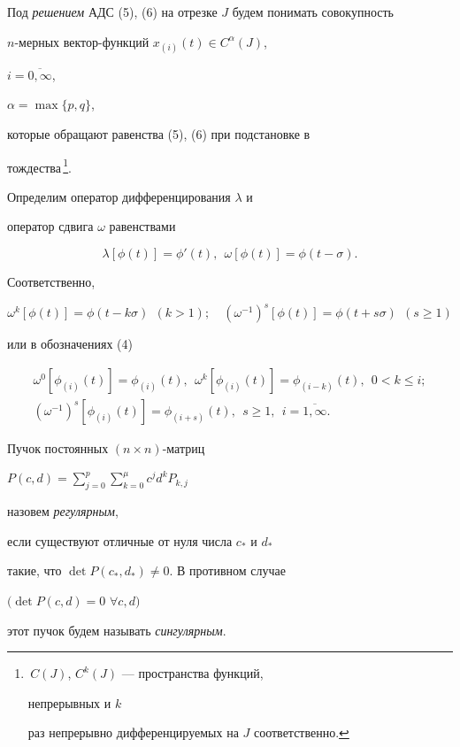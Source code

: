 \begin{defn}


Под {\it решением} АДС (5), (6) на отрезке $J$ будем понимать совокупность


$n$-мерных вектор-функций $x_{(i)}(t) \in C^{\alpha} (J)$,


$i=\overline{0, \infty}$,


$\alpha = \max \lbrace p,q \rbrace$,


которые обращают равенства (5), (6) при подстановке в


тождества\,\footnote{\,$C(J)$, $C^k (J)$ --- пространства функций, 


непрерывных и $k$


раз непрерывно дифференцируемых на $J$ соответственно.}.


\end{defn}





Определим оператор дифференцирования $\lambda$ и


оператор сдвига $\omega$ равенствами


$$


\lambda [\phi (t)]=\phi '(t),\ \ \omega [\phi(t)]=\phi (t-\sigma).


$$


Соответственно, 


$$


\omega^k[\phi(t)]=\phi(t-k\sigma ) \ \ (k>1); \quad


({\omega^{-1}})^s[\phi(t)]=\phi(t+s\sigma) \ \ (s\ge 1)


$$


или в обозначениях (4)


\begin{gather*}


\omega^0[\phi_{(i)}(t)]=\phi_{(i)}(t),\ \


\omega^k[\phi_{(i)}(t)]=\phi_{(i-k)}(t), \ \ 0< k \le i;\\


%


({\omega^{-1}})^s[\phi_{(i)}(t)]=\phi_{(i+s)}(t), \ \


s \ge 1,\ \ i=\overline{1,\infty }.


\end{gather*}





\begin{defn}


Пучок постоянных $(n \times n)$-матриц


$P(c,d)=\sum\limits_{j=0}^{p}{\sum\limits_{k=0}^{\mu}{c^j d^k P_{k,j}}}$


назовем {\it регулярным},


если существуют отличные от нуля числа $c_*$ и $d_*$


такие, что $\det P(c_*,d_*) \ne 0$. В противном случае 


$(\det P(c,d)=0$\; $\forall c,d)$ 


этот пучок будем называть {\it сингулярным}.


\end{defn}





